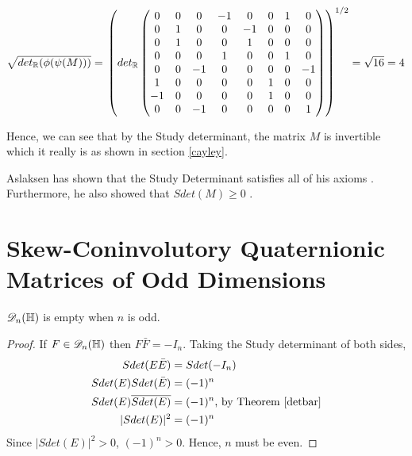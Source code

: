 \begin{ex}
\begin{enumerate}
 		$\sqrt{det_{\operatorname{\mathbb{R}}}(\phi(\psi(M)))} =$
 		$\begin{pmatrix}
 		det_{\operatorname{\mathbb{R}}}
 		\begin{pmatrix}
 			0 & 0 & 0  & -1 &  0 & 0 & 1 &  0 \\
 			0 & 1 & 0  &  0 & -1 & 0 & 0 &  0 \\
 			0 & 1 & 0  &  0 &  1 & 0 & 0 &  0 \\
 			0 & 0 & 0  &  1 &  0 & 0 & 1 &  0 \\
 			0 & 0 & -1 &  0 &  0 & 0 & 0 & -1 \\
 			1 & 0 & 0  &  0 &  0 & 1 & 0 &  0 \\
 		   -1 & 0 & 0  &  0 &  0 & 1 & 0 &  0 \\
 		    0 & 0 & -1 &  0 &  0 & 0 & 0 &  1 \\
 		\end{pmatrix}
 		\end{pmatrix}^{1/2} = \sqrt{16} = 4$
 	\end{enumerate}


\end{ex}

Hence, we can see that by the Study determinant, the matrix $M$ is invertible which it really is as shown in section \ref{cayley}. 

Aslaksen has shown that the Study Determinant satisfies all of his axioms \cite{aslaksen}. Furthermore, he also showed that $Sdet(M) \geq 0$ \cite{aslaksen}.

\section{Skew-Coninvolutory Quaternionic Matrices of Odd Dimensions}
\begin{prop}
 $\mathscr{D}_n(\operatorname{\mathbb{H}})$ is empty when $n$ is odd.
\end{prop}
\begin{proof}
	If $F \in \mathscr{D}_{n}(\operatorname{\mathbb{H}})$ then $F\bar{F} = -I_n$. \newline Taking the Study determinant of both sides, 
	\begin{align*}
		Sdet(E\bar{E}) &= Sdet(-I_n) \\
		Sdet(E)Sdet(\bar{E}) &= (-1)^n \\
		Sdet(E)\overline{Sdet(E)} &= (-1)^n \text{, by Theorem \ref{detbar}} \\
		|Sdet(E)|^2 &= (-1)^n
	\end{align*}
	Since $|Sdet(E)|^2 > 0$, $(-1)^n > 0$. Hence, $n$ must be even.
\end{proof}

